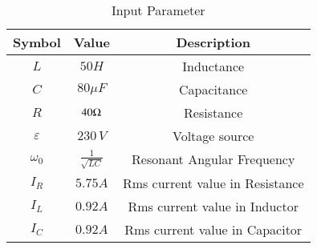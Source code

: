 \begin{table}[!ht]
\renewcommand\thetable{1}
   \centering
\begin{tabular}{|c|c|c|}
  \hline
  \textbf{Symbol} & \textbf{Value} & \textbf{Description}\\
  \hline
  $L$ &  $50H$ & Inductance\\
  \hline 
  $C$ &  $80 \mu F$ & Capacitance\\
  \hline
  $R$ &  $40\ohm$ & Resistance\\
  \hline
  $\varepsilon$ & $230\, V$ & Voltage source\\
  \hline
   $\omega_0$ & $\frac{1}{\sqrt{LC}}$ & Resonant Angular Frequency\\
  \hline
    $I_R$ &  $5.75A$ & Rms current value in Resistance\\
  \hline
   $I_L$ &  $0.92A$ & Rms current value in Inductor\\
  \hline
    $I_C$ &  $0.92A$ & Rms current value in Capacitor\\
  \hline
\end{tabular}
\caption{Input Parameter}
  \label{Table: 12.7.17.1}
\end{table}
